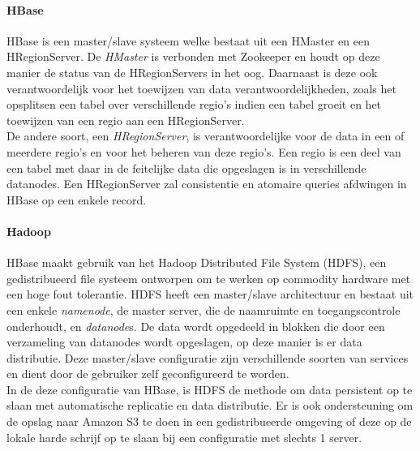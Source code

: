 \paragraph{HBase\cite{george2011hbase}} HBase is een master/slave systeem welke bestaat uit een HMaster en een HRegionServer. De \textit{HMaster} is verbonden met Zookeeper en houdt op deze manier de status van de HRegionServers in het oog. Daarnaast is deze ook verantwoordelijk voor het toewijzen van data verantwoordelijkheden, zoals het opsplitsen een tabel over verschillende regio's indien een tabel groeit en het toewijzen van een regio aan een HRegionServer.\\
De andere soort, een \textit{HRegionServer}, is verantwoordelijke voor de data in een of meerdere regio's en voor het beheren van deze regio's. Een regio is een deel van een tabel met daar in de feitelijke data die opgeslagen is in verschillende datanodes. Een HRegionServer zal consistentie en atomaire queries afdwingen in HBase op een enkele record.  

\paragraph{Hadoop\cite{borthakur2007hadoop}} HBase maakt gebruik van het Hadoop Distributed File System (HDFS), een gedistribueerd file systeem ontworpen om te werken op commodity hardware met een hoge fout tolerantie. HDFS heeft een master/slave architectuur en bestaat uit een enkele \textit{namenode}, de master server, die de naamruimte en toegangscontrole onderhoudt, en \textit{datanode}s. De data wordt opgedeeld in blokken die door een verzameling van datanodes wordt opgeslagen, op deze manier is er data distributie. Deze master/slave configuratie zijn verschillende soorten van services en dient door de gebruiker zelf geconfigureerd te worden. \\
In de deze configuratie van HBase, is HDFS de methode om data persistent op te slaan met automatische replicatie en data distributie. Er is ook ondersteuning om de opslag naar Amazon S3 te doen in een gedistribueerde omgeving of deze op de lokale harde schrijf op te slaan bij een configuratie met slechts 1 server.\cite{george2011hbase}

